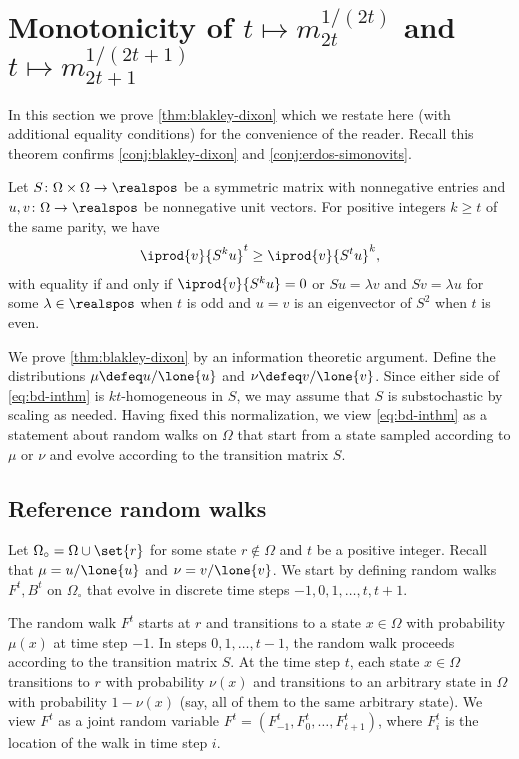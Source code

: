 \section{Monotonicity of 
$t\mapsto m_{2t}^{1/(2t)}$ and 
$t\mapsto m_{2t+1}^{1/(2t+1)}$}
\label{sec:monotonicity}

In this section we prove \autoref{thm:blakley-dixon}
which we restate here 
(with additional equality conditions) 
for the convenience of the reader.
Recall this theorem confirms 
\autoref{conj:blakley-dixon} 
and \autoref{conj:erdos-simonovits}.

\begingroup
\def\thetheorem{\ref{thm:blakley-dixon}}
\begin{theorem}[restated]
Let $S\colon\Omega\times\Omega\to\realspos$ be a 
symmetric matrix with nonnegative entries and 
$u,v\colon\Omega\to\realspos$ be
nonnegative unit vectors. For positive integers 
$k\ge t$ of the same
parity, we have
  \begin{align}
    \iprod{v}{S^ku}^t\ge \iprod{v}{S^tu}^k,
    \label{eq:bd-inthm}
  \end{align}
with equality if and only if $\iprod{v}{S^ku} = 0$ or
$Su =\lambda v$ and $Sv=\lambda u$ for some 
$\lambda\in\realspos$ when $t$ is odd and 
$u=v$ is an eigenvector of $S^2$ when $t$ is even.
\end{theorem}
\addtocounter{theorem}{-1}
\endgroup

We prove \autoref{thm:blakley-dixon} by an 
information theoretic argument.
Define the distributions $\mu \defeq u/\lone{u}$ and 
$\nu \defeq v/\lone{v}$.
Since either side of 
\autoref{eq:bd-inthm} is $kt$-homogeneous in $S$, we may
assume that $S$ is substochastic by scaling as needed. 
Having fixed this normalization, we view 
\autoref{eq:bd-inthm} as a statement about random walks
on $\Omega$ that start from a state sampled according to 
$\mu$ or $\nu$ and evolve according to the transition 
matrix $S$.

\subsection{Reference random walks}
\label{sec:refwalk}
\def\OC{\Omega_\circ}
Let $\OC = \Omega\cup\set{r}$ for some state $r\notin\Omega$ and 
$t$ be a positive integer. Recall that 
$\mu = u/\lone{u}$ and $\nu = v/\lone{v}$.
We start by defining random walks $F^t, B^t$ on $\OC$
that evolve in discrete time steps $-1, 0,1, \ldots, t, t+1$.

The random walk $F^t$ starts at $r$ and transitions to 
a state $x\in\Omega$ with probability $\mu(x)$ at time step $-1$.
In steps $0,1,\ldots, t-1$, the random walk proceeds according to
the transition matrix $S$. At the time step $t$,
each state $x\in\Omega$ transitions to $r$ 
with probability $\nu(x)$ and
transitions to an arbitrary state in 
$\Omega$ with probability
$1-\nu(x)$ 
(say, all of them to the same arbitrary state).
We view $F^t$ as a joint random variable
$F^t = (F^t_{-1},F^t_0,\ldots,F^t_{t+1})$,
where $F^t_i$ is the location of the walk in time step $i$.

